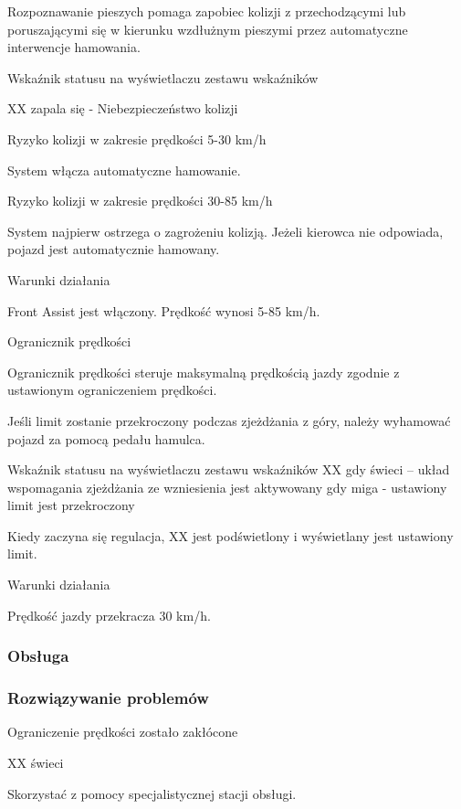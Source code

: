 Rozpoznawanie pieszych pomaga zapobiec kolizji z przechodzącymi lub poruszającymi się w kierunku wzdłużnym pieszymi przez automatyczne interwencje hamowania.

Wskaźnik statusu na wyświetlaczu zestawu wskaźników

XX zapala się - Niebezpieczeństwo kolizji

Ryzyko kolizji w zakresie prędkości 5-30 km/h

System włącza automatyczne hamowanie.

Ryzyko kolizji w zakresie prędkości 30-85 km/h

System najpierw ostrzega o zagrożeniu kolizją. Jeżeli kierowca nie odpowiada, pojazd jest automatycznie hamowany.

Warunki działania
\begin{itemizeTick}
	\itemTick Front Assist jest włączony.
	\itemTick Prędkość wynosi 5-85 km/h.
\end{itemizeTick}

Ogranicznik prędkości

Ogranicznik prędkości steruje maksymalną prędkością jazdy zgodnie z ustawionym ograniczeniem prędkości.

Jeśli limit zostanie przekroczony podczas zjeżdżania z góry, należy wyhamować pojazd za pomocą pedału hamulca.

Wskaźnik statusu na wyświetlaczu zestawu wskaźników
XX gdy świeci – układ wspomagania zjeżdżania ze wzniesienia jest aktywowany
gdy miga - ustawiony limit jest przekroczony

Kiedy zaczyna się regulacja, XX jest podświetlony i wyświetlany jest ustawiony limit.

Warunki działania
\begin{itemizeTick}
	\itemTick Prędkość jazdy przekracza 30 km/h.
\end{itemizeTick}

\subsubsection{Obsługa}

\subsubsection{Rozwiązywanie problemów}

Ograniczenie prędkości zostało zakłócone

XX świeci

\begin{itemizeArrow}
	\itemArrow Skorzystać z pomocy specjalistycznej stacji obsługi.
\end{itemizeArrow}

